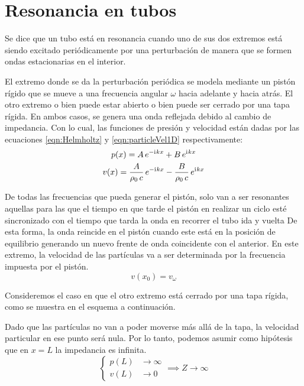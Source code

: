 \documentclass[a5paper,12pt,twoside]{book}
\begin{document}
\section{Resonancia en tubos}

Se dice que un tubo está en resonancia cuando uno de sus dos extremos está siendo excitado periódicamente por una perturbación de manera que se formen ondas estacionarias en el interior.

El extremo donde se da la perturbación periódica se modela mediante un pistón rígido que se mueve a una frecuencia angular $\omega$ hacia adelante y hacia atrás.
El otro extremo o bien puede estar abierto o bien puede ser cerrado por una tapa rígida.
En ambos casos, se genera una onda reflejada debido al cambio de impedancia.
Con lo cual, las funciones de presión y velocidad están dadas por las ecuaciones \ref{eqn:Helmholtz} y \ref{eqn:particleVel1D} respectivamente:
\begin{gather}
    p(x) = A \, e^{-\mathrm{i}\mkern1mu k x} + B \, e^{\mathrm{i}\mkern1mu k x}
    \label{eqn:tubePressure}
    \\
    v(x) = \frac{A}{\rho_0 \, c} \, e^{-\mathrm{i}\mkern1mu k x} - \frac{B}{\rho_0 \, c} \, e^{\mathrm{i}\mkern1mu k x}
    \label{eqn:tubeVelocity}
\end{gather}

De todas las frecuencias que pueda generar el pistón, solo van a ser resonantes aquellas para las que el tiempo en que tarde el pistón en realizar un ciclo esté sincronizado con el tiempo que tarda la onda en recorrer el tubo ida y vuelta
De esta forma, la onda reincide en el pistón cuando este está en la posición de equilibrio generando un nuevo frente de onda coincidente con el anterior.
En este extremo, la velocidad de las partículas va a ser determinada por la frecuencia impuesta por el pistón.
\begin{equation}
    v(x_0) = v_\omega
    \label{eqn:tubeV0}
\end{equation}

Consideremos el caso en que el otro extremo está cerrado por una tapa rígida, como se muestra en el esquema a continuación.

\begin{center}
    \def\svgwidth{0.6\linewidth}
    
\end{center}

Dado que las partículas no van a poder moverse más allá de la tapa, la velocidad particular en ese punto será nula.
Por lo tanto, podemos asumir como hipótesis que en $x=L$ la impedancia es infinita.
\begin{equation*}
    \left\{
    \begin{aligned}
        p(L) &\to \infty
        \\
        v(L) &\to 0
    \end{aligned}
    \right.
    \implies
    Z \to \infty
\end{equation*}
\end{document}
